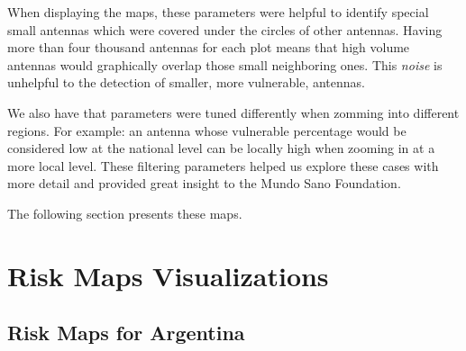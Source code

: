 When displaying the maps, these parameters were helpful to identify special small antennas which were covered under the circles of other antennas. Having more than four thousand antennas for each plot means that high volume antennas would graphically overlap those small neighboring ones. This \textit{noise} is unhelpful to the detection of smaller, more vulnerable, antennas.

We also have that parameters were tuned differently when zomming into different regions. For example: an antenna whose vulnerable percentage would be considered low at the national level can be locally high when zooming in at a more local level. These filtering parameters helped us explore these cases with more detail and provided great insight to the Mundo Sano Foundation.

The following section presents these maps.

\section{Risk Maps Visualizations}\label{section:riskmaps}

\subsection{Risk Maps for Argentina}



